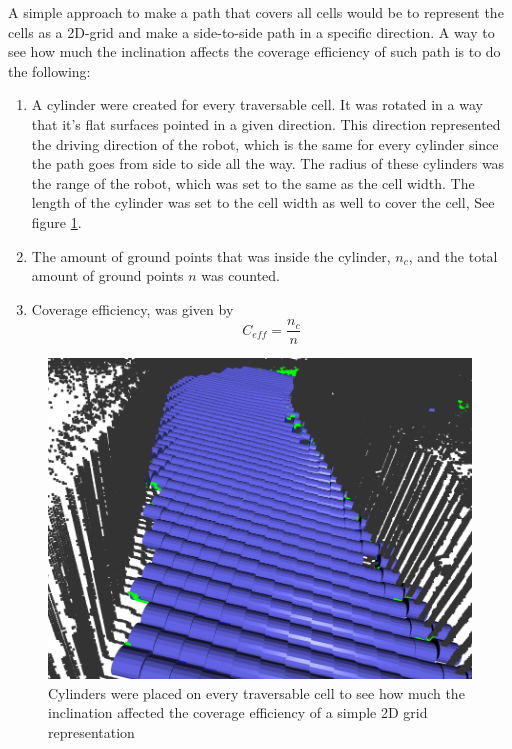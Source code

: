 A simple approach to make a path that covers all cells would be to represent the cells as a 2D-grid and make a side-to-side path in a specific direction. A way to see how much the inclination affects the coverage efficiency of such path is to do the following:
\begin{enumerate}
    \item A cylinder were created for every traversable cell. It was rotated in a way that it's flat surfaces pointed in a given direction. This direction represented the driving direction of the robot, which is the same for every cylinder since the path goes from side to side all the way. The radius of these cylinders was the range of the robot, which was set to the same as the cell width. The length of the cylinder was set to the cell width as well to cover the cell, See figure \ref{fig:cylinders}.
    \item The amount of ground points that was inside the cylinder, $n_c$, and the total amount of ground points $n$ was counted. 
    \item Coverage efficiency, was given by \begin{equation}
        C_{eff} =\frac{n_c}{n} 
    \end{equation}
\end{enumerate}  

\begin{figure}
    \centering
    \includegraphics[width=\textwidth]{figures/tunnelskippedareascylinder.png}
    \caption{Cylinders were placed on every traversable cell to see how much the inclination affected the coverage efficiency of a simple 2D grid representation}
    \label{fig:cylinders}
\end{figure}


